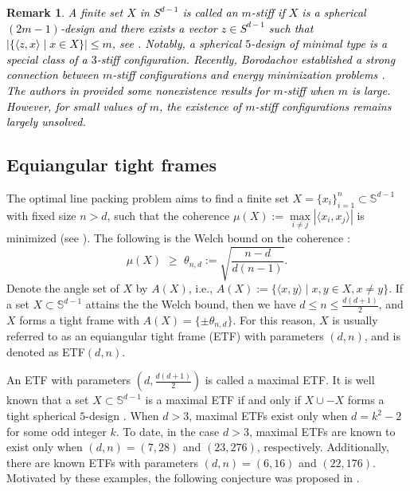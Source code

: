 \documentclass[11pt]{article}
\newtheorem{remark}{Remark}[section]
\theoremstyle{definition}
\theoremstyle{remark}
\begin{document}
\begin{remark}
\textcolor{black}{
A finite set $X$ in $S^{d-1}$ is called an $m$-stiff if $X$ is a  spherical $(2m-1)$-design and there exists a vector $z\in S^{d-1}$ such that $|\{\langle z,x\rangle \mid x\in X\}|\leq m$, see \cite{BKN26,B22,B24,FL95}.   
Notably, a spherical $5$-design of minimal type is a special class of a $3$-stiff configuration. 
Recently, Borodachov established a strong connection between $m$-stiff configurations and energy minimization problems \cite{B22,B24}.
The authors in \cite{BKN26} provided some nonexistence results for $m$-stiff when $m$ is large.
However, for small values of $m$, the existence of $m$-stiff configurations remains largely unsolved.
}

\end{remark}

\subsection{Equiangular tight frames}
The optimal line packing problem aims to find a finite set
$X=\{ x_i \}_{i=1}^{n}\subset\mathbb{S}^{d-1}$ with fixed size $n>d$, such that the coherence $\mu(X):=\max\limits_{i\neq j}|\langle x_i, x_j\rangle|$ is minimized (see
\cite{Conway,Fickus2,Haas,Jasper}). 
The following is the Welch bound on the coherence \cite{Welch}: 
\begin{equation}\label{welch}
\mu(X)\,\,\geq\,\, \theta_{n,d}:=\sqrt{\frac{n-d}{d(n-1)}}.
\end{equation}
Denote the angle set of $X$ by $A(X)$, i.e., $A(X):=\{\langle x,y\rangle \mid x,y\in X,x\neq y\}$.
If a set $X\subset\mathbb{S}^{d-1}$ attains the the Welch bound, then we have $d\leq n\leq \frac{d(d+1)}{2}$, and $X$ forms a tight frame with $A(X)=\{\pm\theta_{n,d}\}$. 
For this reason, $X$ is usually referred to as an equiangular tight frame (ETF) with parameters $(d,n)$, and is denoted as ETF$(d,n)$. 

An ETF with parameters $(d,\frac{d(d+1)}{2})$ is called a maximal ETF. 
It is well known that a set $X\subset\mathbb{S}^{d-1}$ is a maximal ETF if and only if $X\cup -X$ forms a tight spherical $5$-design \cite{BB09b}. 
When $d>3$, maximal ETFs exist only when $d=k^2-2$ for some odd integer $k$. 
To date, in the case $d>3$, maximal ETFs are known to exist only
when $(d, n) = (7, 28)$ and $(23, 276)$, respectively. 
Additionally, there are known ETFs with parameters $(d, n) = (6, 16)$ and $(22, 176)$. 
Motivated by these examples, the following conjecture was proposed in \cite[Conjecture~4]{XXY21}.
\end{document}
